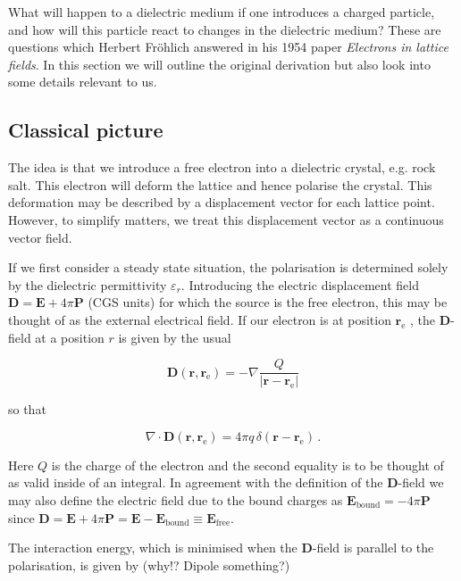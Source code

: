 \documentclass[12pt]{report}
\renewcommand{\vec}[1]{\boldsymbol{\mathbf{#1}}}                        %
\newcommand{\question}[1]{\textcolor{question}{#1}}
\begin{document}
What will happen to a dielectric medium if one introduces a charged particle, and how will this particle react to changes in the dielectric medium? These are questions which Herbert Fröhlich answered in his 1954 paper \textit{Electrons in lattice fields}\cite{electronsInLatticeFields}. In this section we will outline the original derivation but also look into some details relevant to us.

\subsection{Classical picture}

The idea is that we introduce a free electron into a dielectric crystal, e.g. rock salt. This electron will deform the lattice and hence polarise the crystal. This deformation may be described by a displacement vector for each lattice point. However, to simplify matters, we treat this displacement vector as a continuous vector field.

If we first consider a steady state situation, the polarisation is determined solely by the dielectric permittivity $ \varepsilon_r $. Introducing the electric displacement field $ \vec D = \vec E + 4 \pi \vec P $ (CGS units) for which the source is the free electron, this may be thought of as the external electrical field. If our electron is at position $ \vec r_\text{e} $ , the $ \vec D $-field at a position $ r $ is given by the usual

\begin{equation}
	\vec D( \vec r, \vec r_\text{e}) = - \nabla \frac{Q}{\left| \vec r - \vec r_\text{e} \right|}
\end{equation}

so that

\begin{equation}
	\nabla \cdot \vec D( \vec r, \vec r_\text{e}) = 4 \pi q \, \delta(\vec r - \vec r_\text{e}) \,.
\end{equation}

Here $ Q $ is the charge of the electron and the second equality is to be thought of as valid inside of an integral. In agreement with the definition of the $ \vec D $-field we may also define the electric field due to the bound charges as $ \vec E_\text{bound} = - 4 \pi \vec P $ since $ \vec D = \vec E + 4 \pi \vec P = \vec E - \vec E_\text{bound} \equiv \vec E_\text{free} $.

The interaction energy, which is minimised when the $ \vec D $-field is parallel to the polarisation, is given by \question{(why!? Dipole something?)}
\end{document}

